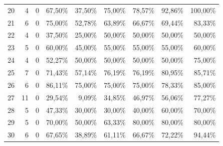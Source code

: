 \begin{table}[htbp]
{\begin{tabular}{r r r r r r r r r}
20 & 4 & 0 & 67,50\% & 37,50\% & 75,00\% & 78,57\% & 92,86\% & 100,00\% \\
21 & 6 & 0 & 75,00\% & 52,78\% & 63,89\% & 66,67\% & 69,44\% & 83,33\% \\
22 & 4 & 0 & 37,50\% & 25,00\% & 50,00\% & 50,00\% & 50,00\% & 50,00\% \\
23 & 5 & 0 & 60,00\% & 45,00\% & 55,00\% & 55,00\% & 55,00\% & 60,00\% \\
24 & 4 & 0 & 52,27\% & 50,00\% & 50,00\% & 50,00\% & 50,00\% & 75,00\% \\
25 & 7 & 0 & 71,43\% & 57,14\% & 76,19\% & 76,19\% & 80,95\% & 85,71\% \\
26 & 6 & 0 & 86,11\% & 75,00\% & 75,00\% & 75,00\% & 78,33\% & 85,00\% \\
27 & 11 & 0 & 29,54\% & 9,09\% & 34,85\% & 46,97\% & 56,06\% & 77,27\% \\
28 & 5 & 0 & 47,33\% & 30,00\% & 30,00\% & 40,00\% & 60,00\% & 70,00\% \\
29 & 5 & 0 & 70,00\% & 50,00\% & 63,33\% & 80,00\% & 80,00\% & 80,00\% \\
30 & 6 & 0 & 67,65\% & 38,89\% & 61,11\% & 66,67\% & 72,22\% & 94,44\% \\
\bottomrule
\end{tabular}
}
\end{table}


